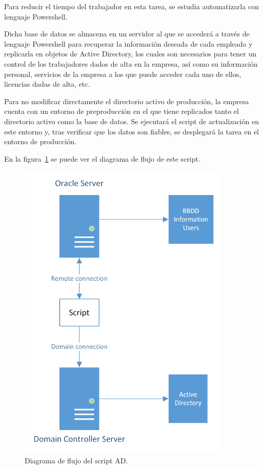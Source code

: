 \documentclass[a4paper, 12pt]{book}
\begin{document}
Para reducir el tiempo del trabajador en esta tarea, se estudia automatizarla con lenguaje Powershell.

Dicha base de datos se almacena en un servidor al que se accederá a través de lenguaje Powershell para recuperar la información deseada de cada empleado y replicarla en objetos de Active Directory, los cuales son necesarios para tener un control de los trabajadores dados de alta en la empresa, así como su información personal, servicios de la empresa a los que puede acceder cada uno de ellos, licencias dadas de alta, etc.

Para no modificar directamente el directorio activo de producción, la empresa cuenta con un entorno de preproducción en el que tiene replicados tanto el directorio activo como la base de datos. Se ejecutará el script de actualización en este entorno y, tras verificar que los datos son fiables, se desplegará la tarea en el entorno de producción.

En la figura~\ref{fig:UpdateUsers_diagrama} se puede ver el diagrama de flujo de este script.

\begin{figure}
	\centering
	\includegraphics[width=10cm, keepaspectratio]{img/UpdateUsers_diagrama.png}
	\caption{Diagrama de flujo del script AD.}
	\label{fig:UpdateUsers_diagrama}
\end{figure}
\end{document}
